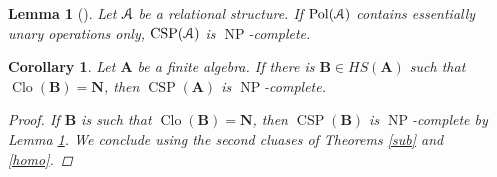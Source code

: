 \documentclass{amsart}
\theoremstyle{plain}
\newtheorem{corollary}[theorem]{Corollary}
\newtheorem{lemma}[theorem]{Lemma}
\theoremstyle{definition}
\theoremstyle{remark}
\DeclareMathOperator{\Clo}{Clo}
\DeclareMathOperator{\CSP}{CSP}
\DeclareMathOperator{\Pol}{Pol}
\DeclareMathOperator{\NP}{NP}
\begin{document}
\begin{lemma} [\cite{jeavons}]
    \label{ess-unary}
    Let $\EuScript{A}$ be a relational structure. 
    If $\Pol(\EuScript{A})$ contains essentially unary operations only, $\CSP(\EuScript{A})$ is $\NP$-complete. 
\end{lemma}

\begin{corollary}
    Let $\mathbf{A}$ be a finite 
    algebra. 
    If there is $\mathbf{B} \in HS(\mathbf{A})$ such that $\Clo(\mathbf{B}) = \mathbf{N}$, then 
    $\CSP(\mathbf{A})$ is $\NP$-complete. 
    \begin{proof}
        If $\mathbf{B}$ is such that $\Clo(\mathbf{B}) = \mathbf{N}$, then $\CSP(\mathbf{B})$ is $\NP$-complete by Lemma \ref{ess-unary}. 
        We conclude using the second cluases of Theorems \ref{sub} and \ref{homo}. 
   \end{proof}
\end{corollary}
\end{document}
